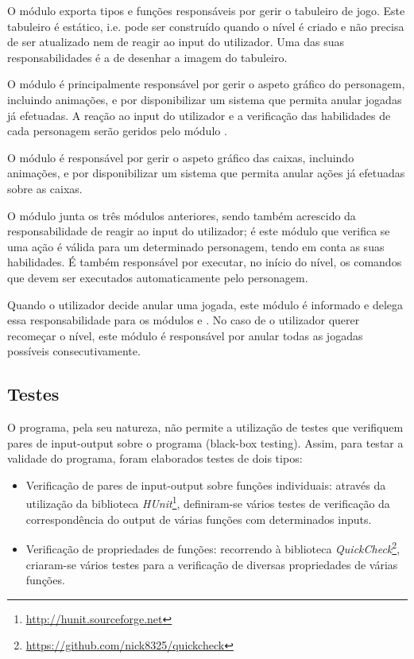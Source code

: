 \documentclass[a4paper]{article}
\begin{document}
\bigskip

O módulo  exporta tipos e funções responsáveis por gerir o tabuleiro de jogo. Este tabuleiro é estático, i.e. pode ser construído quando o nível é criado e não precisa de ser atualizado nem de reagir ao input do utilizador. Uma das suas responsabilidades é a de desenhar a imagem do tabuleiro.

\bigskip

O módulo  é principalmente responsável por gerir o aspeto gráfico do personagem, incluindo animações, e por disponibilizar um sistema que permita anular jogadas já efetuadas. A reação ao input do utilizador e a verificação das habilidades de cada personagem serão geridos pelo módulo .

\bigskip

O módulo  é responsável por gerir o aspeto gráfico das caixas, incluindo animações, e por disponibilizar um sistema que permita anular ações já efetuadas sobre as caixas.

\bigskip

O módulo  junta os três módulos anteriores, sendo também acrescido da responsabilidade de reagir ao input do utilizador; é este módulo que verifica se uma ação é válida para um determinado personagem, tendo em conta as suas habilidades. É também responsável por executar, no início do nível, os comandos que devem ser executados automaticamente pelo personagem.

Quando o utilizador decide anular uma jogada, este módulo é informado e delega essa responsabilidade para os módulos  e . No caso de o utilizador querer recomeçar o nível, este módulo é responsável por anular todas as jogadas possíveis consecutivamente.

\subsection{Testes}

O programa, pela seu natureza, não permite a utilização de testes que verifiquem pares de input-output sobre o programa (black-box testing). Assim, para testar a validade do programa, foram elaborados testes de dois tipos:

\begin{itemize}
	\item Verificação de pares de input-output sobre funções individuais: através da utilização da biblioteca \textit{HUnit}\footnote{\url{http://hunit.sourceforge.net}}, definiram-se vários testes de verificação da correspondência do output de várias funções com determinados inputs.
	\item Verificação de propriedades de funções: recorrendo à biblioteca \textit{QuickCheck}\footnote{\url{https://github.com/nick8325/quickcheck}}, criaram-se vários testes para a verificação de diversas propriedades de várias funções.
\end{itemize}
\end{document}
